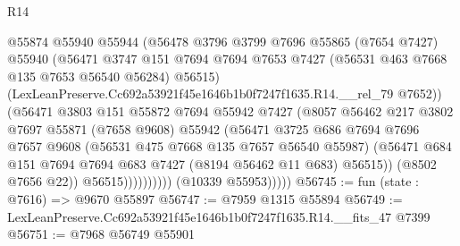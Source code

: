 \begin{lexlean}{R14}
\begin{coremodule}
                              @55874
                              @55940
                              @55944
                              (@56478
                                @3796
                                @3799
                                @7696
                                @55865
                                (@7654 @7427)
                                @55940
                                (@56471
                                  @3747
                                  @151
                                  @7694
                                  @7694
                                  @7653
                                  @7427
                                  (@56531 @463 @7668 @135 @7653 @56540 @56284)
                                  @56515)
                                (LexLeanPreserve.Cc692a53921f45e1646b1b0f7247f1635.R14.__rel_79
                                  @7652))
                              (@56471
                                @3803
                                @151
                                @55872
                                @7694
                                @55942
                                @7427
                                (@8057
                                  @56462
                                  @217
                                  @3802
                                  @7697
                                  @55871
                                  (@7658 @9608)
                                  @55942
                                  (@56471
                                    @3725
                                    @686
                                    @7694
                                    @7696
                                    @7657
                                    @9608
                                    (@56531 @475 @7668 @135 @7657 @56540 @55987)
                                    (@56471
                                      @684
                                      @151
                                      @7694
                                      @7694
                                      @683
                                      @7427
                                      (@8194 @56462 @11 @683)
                                      @56515))
                                  (@8502 @7656 @22))
                                @56515))))))))))
            (@10339 @55953)))))
@56745 := fun (state : @7616) => @9670 @55897
@56747 := @7959 @1315 @55894
@56749 := LexLeanPreserve.Cc692a53921f45e1646b1b0f7247f1635.R14.__fits_47 @7399
@56751 := @7968 @56749 @55901

\end{coremodule}
\end{lexlean}
